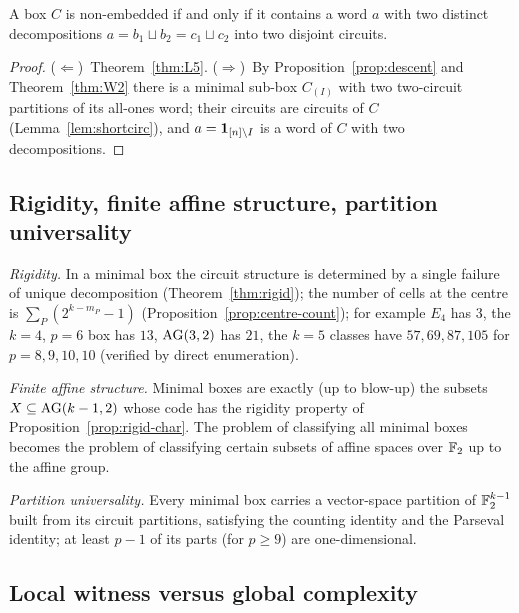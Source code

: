 \begin{corollary}\label{cor:cert}
A box $C$ is non-embedded if and only if it contains a word $a$ with two distinct decompositions $a=b_1\sqcup b_2=c_1\sqcup c_2$ into two disjoint circuits.
\end{corollary}

\begin{proof}
($\Leftarrow$)~Theorem~\ref{thm:L5}. ($\Rightarrow$)~By Proposition~\ref{prop:descent} and Theorem~\ref{thm:W2} there is a minimal sub-box $C_{(I)}$ with two two-circuit partitions of its all-ones word; their circuits are circuits of $C$ (Lemma~\ref{lem:shortcirc}), and $a=\mathbf 1_{[n]\setminus I}$ is a word of $C$ with two decompositions.
\end{proof}

\subsection{Rigidity, finite affine structure, partition universality}

\emph{Rigidity.} In a minimal box the circuit structure is determined by a single failure of unique decomposition (Theorem~\ref{thm:rigid}); the number of cells at the centre is $\sum_P(2^{k-m_P}-1)$ (Proposition~\ref{prop:centre-count}); for example $E_4$ has $3$, the $k=4$, $p=6$ box has $13$, $\mathrm{AG}(3,2)$ has $21$, the $k=5$ classes have $57,69,87,105$ for $p=8,9,10,10$ (verified by direct enumeration).

\emph{Finite affine structure.} Minimal boxes are exactly (up to blow-up) the subsets $X\subseteq\mathrm{AG}(k-1,2)$ whose code has the rigidity property of Proposition~\ref{prop:rigid-char}. The problem of classifying all minimal boxes becomes the problem of classifying certain subsets of affine spaces over $\mathbb F_2$ up to the affine group.

\emph{Partition universality.} Every minimal box carries a vector-space partition of $\mathbb F_2^{k-1}$ built from its circuit partitions, satisfying the counting identity and the Parseval identity; at least $p-1$ of its parts (for $p\ge9$) are one-dimensional.

\subsection{Local witness versus global complexity}


